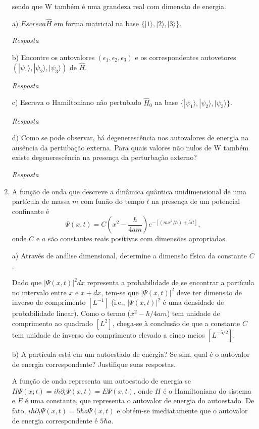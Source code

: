 \begin{enumerate}[start=1,label={\bfseries Q\arabic*.}]
sendo que W também é uma grandeza real com dimensão de energia.



  a) $Escreva \hat{H}$ em forma matricial na base $\{ |1 \rangle, |2 \rangle, |3 \rangle \}$.

  \textit{Resposta}

  b) Encontre os autovalores $\left( \epsilon_{1}, \epsilon_{2}, \epsilon_{3} \right)$ e os correspondentes autovetores $\left( |\psi_{1} \rangle, |\psi_{2} \rangle, |\psi_{3} \rangle \right)$ de $\hat{H}$.

  \textit{Resposta}

  c) Escreva o Hamiltoniano não pertubado $\hat{H}_{0}$ na base $\{|\psi_{1}\rangle, |\psi_{2}\rangle, |\psi_{3}\rangle \}$.

  \textit{Resposta}

  d) Como se pode observar, há degenerescência nos autovalores de energia na ausência da pertubação externa. Para quais valores não nulos de W também existe degenerescência na presença da perturbação externo?

  \textit{Resposta}




\item A função de onda que descreve a dinâmica quântica unidimensional de uma partícula de massa $m$ com funão do tempo $t$ na presença de um potencial confinante é
$$
\Psi(x,t) = C \left( x^{2} - \frac{\hbar}{4am} \right) e^{-[(mx^{2}/\hbar) + 5it]},
$$
onde $C$ e $a$ são constantes reais positivas com dimensões apropriadas.


  a) Através de análise dimensional, determine a dimensão física da constante $C$.

  \resposta Dado que $|\Psi(x,t)|^{2} dx$ representa a probabilidade de se encontrar a partícula no intervalo entre $x$ e $x+dx$, tem-se que $|\Psi(x,t)|^{2}$ deve ter dimensão de inverso de comprimento $[L^{-1}]$ (i.e., $|\Psi(x,t)|^{2}$ é uma densidade de probabilidade linear). Como o termo ($x^{2} - \hbar/4am$) tem unidade de comprimento ao quadrado $[L^{2}]$, chega-se à conclusão de que a constante $C$ tem unidade de inverso do comprimento elevado a cinco meios $[L^{-5/2}]$.

  b) A partícula está em um autoestado de energia? Se sim,  qual é o autovalor de energia correspondente? Justifique suas respostas.

  \resposta A função de onda representa um autoestado de energia se $H \Psi(x;t) = i \hbar \partial_{t} \Psi (x,t) = E \Psi (x,t)$, onde $H$ é o Hamiltoniano do sistema e $E$ é uma constante, que representa o autovalor de energia do autoestado. De fato, $i \hbar \partial_{t} \Psi (x,t) = 5\hbar a \Psi (x,t)$ e obtém-se imediatamente que o autovalor de energia correspondente é $5 \hbar a$.


\end{enumerate}
